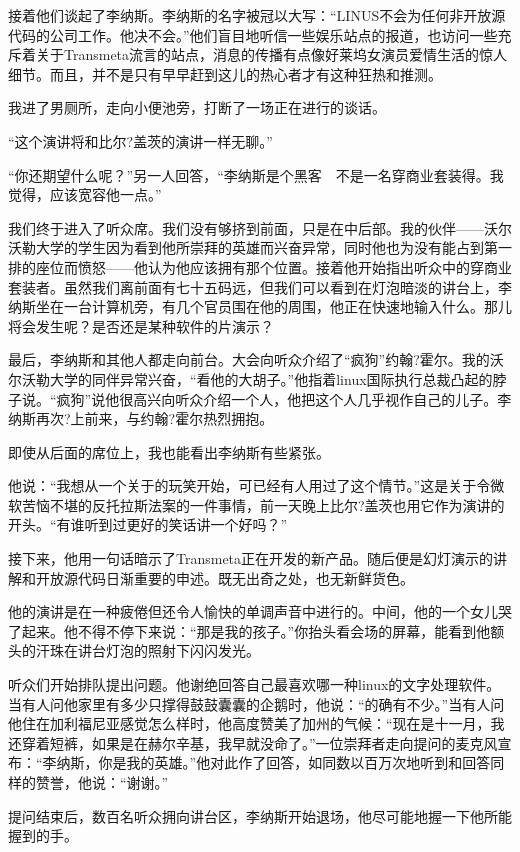 接着他们谈起了李纳斯。李纳斯的名字被冠以大写：“LINUS不会为任何非开放源代码的公司工作。他决不会。”他们盲目地听信一些娱乐站点的报道，也访问一些充斥着关于Transmeta流言的站点，消息的传播有点像好莱坞女演员爱情生活的惊人细节。而且，并不是只有早早赶到这儿的热心者才有这种狂热和推测。

我进了男厕所，走向小便池旁，打断了一场正在进行的谈话。

“这个演讲将和比尔?盖茨的演讲一样无聊。”

“你还期望什么呢？”另一人回答，“李纳斯是个黑客　不是一名穿商业套装得。我觉得，应该宽容他一点。”

我们终于进入了听众席。我们没有够挤到前面，只是在中后部。我的伙伴——沃尔沃勒大学的学生因为看到他所崇拜的英雄而兴奋异常，同时他也为没有能占到第一排的座位而愤怒——他认为他应该拥有那个位置。接着他开始指出听众中的穿商业套装者。虽然我们离前面有七十五码远，但我们可以看到在灯泡暗淡的讲台上，李纳斯坐在一台计算机旁，有几个官员围在他的周围，他正在快速地输入什么。那儿将会发生呢？是否还是某种软件的片演示？

最后，李纳斯和其他人都走向前台。大会向听众介绍了“疯狗”约翰?霍尔。我的沃尔沃勒大学的同伴异常兴奋，“看他的大胡子。”他指着linux国际执行总裁凸起的脖子说。“疯狗”说他很高兴向听众介绍一个人，他把这个人几乎视作自己的儿子。李纳斯再次?上前来，与约翰?霍尔热烈拥抱。

即使从后面的席位上，我也能看出李纳斯有些紧张。

他说：“我想从一个关于的玩笑开始，可已经有人用过了这个情节。”这是关于令微软苦恼不堪的反托拉斯法案的一件事情，前一天晚上比尔?盖茨也用它作为演讲的开头。“有谁听到过更好的笑话讲一个好吗？”

接下来，他用一句话暗示了Transmeta正在开发的新产品。随后便是幻灯演示的讲解和开放源代码日渐重要的申述。既无出奇之处，也无新鲜货色。

他的演讲是在一种疲倦但还令人愉快的单调声音中进行的。中间，他的一个女儿哭了起来。他不得不停下来说：“那是我的孩子。”你抬头看会场的屏幕，能看到他额头的汗珠在讲台灯泡的照射下闪闪发光。

听众们开始排队提出问题。他谢绝回答自己最喜欢哪一种linux的文字处理软件。当有人问他家里有多少只撑得鼓鼓囊囊的企鹅时，他说：“的确有不少。”当有人问他住在加利福尼亚感觉怎么样时，他高度赞美了加州的气候：“现在是十一月，我还穿着短裤，如果是在赫尔辛基，我早就没命了。”一位崇拜者走向提问的麦克风宣布：“李纳斯，你是我的英雄。”他对此作了回答，如同数以百万次地听到和回答同样的赞誉，他说：“谢谢。”

提问结束后，数百名听众拥向讲台区，李纳斯开始退场，他尽可能地握一下他所能握到的手。

